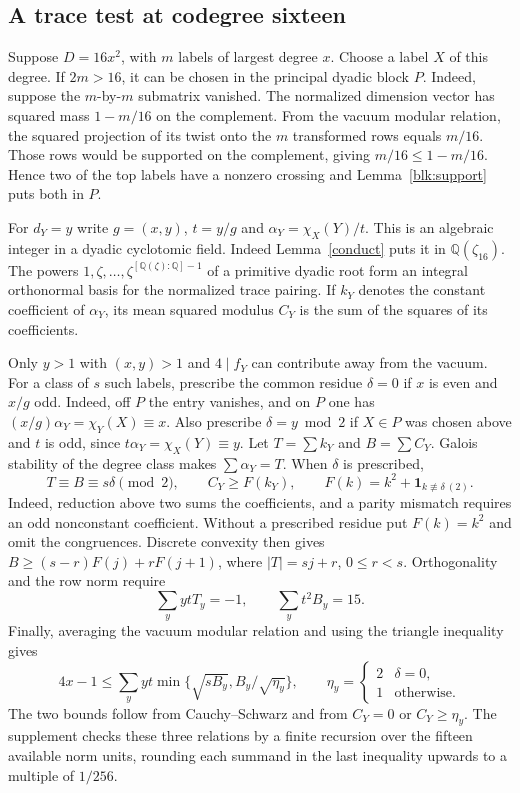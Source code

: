 \documentclass[11pt]{amsart}
\numberwithin{equation}{section}
\begin{document}
\subsection{A trace test at codegree sixteen}\label{term:dyadic}
Suppose $D=16x^2$, with $m$ labels of largest degree $x$. Choose a label $X$ of this degree. If $2m>16$, it can be chosen in the principal dyadic block $P$. Indeed, suppose the $m$-by-$m$ submatrix vanished. The normalized dimension vector has squared mass $1-m/16$ on the complement. From the vacuum modular relation, the squared projection of its twist onto the $m$ transformed rows equals $m/16$. Those rows would be supported on the complement, giving $m/16\le1-m/16$. Hence two of the top labels have a nonzero crossing and Lemma~\ref{blk:support} puts both in $P$.

For $d_Y=y$ write $g=(x,y)$, $t=y/g$ and $\alpha_Y=\chi_X(Y)/t$. This is an algebraic integer in a dyadic cyclotomic field. Indeed Lemma~\ref{conduct} puts it in $\mathbb Q(\zeta_{16})$. The powers $1,\zeta,\ldots,\zeta^{[\mathbb Q(\zeta):\mathbb Q]-1}$ of a primitive dyadic root form an integral orthonormal basis for the normalized trace pairing. If $k_Y$ denotes the constant coefficient of $\alpha_Y$, its mean squared modulus $C_Y$ is the sum of the squares of its coefficients.

Only $y>1$ with $(x,y)>1$ and $4\mid f_Y$ can contribute away from the vacuum. For a class of $s$ such labels, prescribe the common residue $\delta=0$ if $x$ is even and $x/g$ odd. Indeed, off $P$ the entry vanishes, and on $P$ one has $(x/g)\alpha_Y=\chi_Y(X)\equiv x$. Also prescribe $\delta=y\bmod2$ if $X\in P$ was chosen above and $t$ is odd, since $t\alpha_Y=\chi_X(Y)\equiv y$. Let $T=\sum k_Y$ and $B=\sum C_Y$. Galois stability of the degree class makes $\sum\alpha_Y=T$. When $\delta$ is prescribed,
\[
 T\equiv B\equiv s\delta\pmod2,\qquad
 C_Y\ge F(k_Y),\qquad F(k)=k^2+\mathbf1_{k\not\equiv\delta\ (2)}.
\]
Indeed, reduction above two sums the coefficients, and a parity mismatch requires an odd nonconstant coefficient. Without a prescribed residue put $F(k)=k^2$ and omit the congruences. Discrete convexity then gives $B\ge(s-r)F(j)+rF(j+1)$, where $|T|=sj+r$, $0\le r<s$. Orthogonality and the row norm require
\[
 \sum_y ytT_y=-1,\qquad \sum_y t^2B_y=15.
\]
Finally, averaging the vacuum modular relation and using the triangle inequality gives
\[
 4x-1\le\sum_y yt\min\{\sqrt{sB_y},B_y/\sqrt{\eta_y}\},
 \qquad
 \eta_y=\begin{cases}2&\delta=0,\\1&\text{otherwise}.\end{cases}
\]
The two bounds follow from Cauchy--Schwarz and from $C_Y=0$ or $C_Y\ge\eta_y$. The supplement checks these three relations by a finite recursion over the fifteen available norm units, rounding each summand in the last inequality upwards to a multiple of $1/256$.
\end{document}
